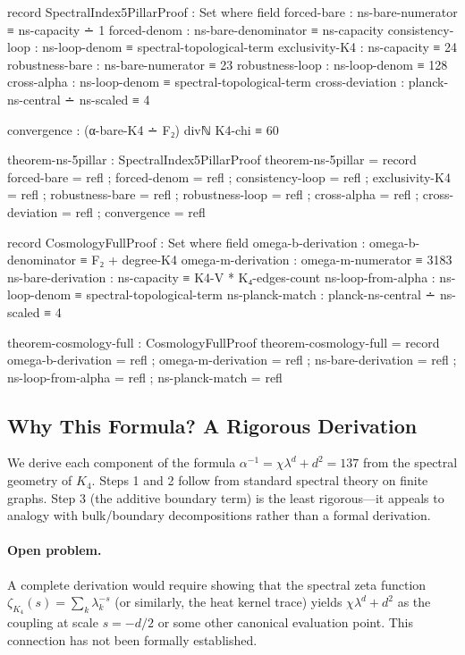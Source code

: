 \documentclass[11pt,a4paper]{book}
\begin{document}
\begin{code}
record SpectralIndex5PillarProof : Set where
  field
    forced-bare : ns-bare-numerator ≡ ns-capacity ∸ 1
    forced-denom : ns-bare-denominator ≡ ns-capacity
    consistency-loop : ns-loop-denom ≡ spectral-topological-term
    exclusivity-K4 : ns-capacity ≡ 24
    robustness-bare : ns-bare-numerator ≡ 23
    robustness-loop : ns-loop-denom ≡ 128
    cross-alpha : ns-loop-denom ≡ spectral-topological-term
    cross-deviation : planck-ns-central ∸ ns-scaled ≡ 4
    
    convergence : (α-bare-K4 ∸ F₂) divℕ K4-chi ≡ 60

theorem-ns-5pillar : SpectralIndex5PillarProof
theorem-ns-5pillar = record
  { forced-bare = refl
  ; forced-denom = refl
  ; consistency-loop = refl
  ; exclusivity-K4 = refl
  ; robustness-bare = refl
  ; robustness-loop = refl
  ; cross-alpha = refl
  ; cross-deviation = refl
  ; convergence = refl
  }

record CosmologyFullProof : Set where
  field
    omega-b-derivation : omega-b-denominator ≡ F₂ + degree-K4
    omega-m-derivation : omega-m-numerator ≡ 3183
    ns-bare-derivation : ns-capacity ≡ K4-V * K₄-edges-count
    ns-loop-from-alpha : ns-loop-denom ≡ spectral-topological-term
    ns-planck-match    : planck-ns-central ∸ ns-scaled ≡ 4

theorem-cosmology-full : CosmologyFullProof
theorem-cosmology-full = record
  { omega-b-derivation = refl
  ; omega-m-derivation = refl
  ; ns-bare-derivation = refl
  ; ns-loop-from-alpha = refl
  ; ns-planck-match    = refl
  }
\end{code}

\subsection{Why This Formula? A Rigorous Derivation}
\label{sec:alpha-formula-why}

We derive each component of the formula $\alpha^{-1} = \chi \lambda^d + d^2 = 137$
from the spectral geometry of $K_4$. Steps 1 and 2 follow from standard spectral
theory on finite graphs. Step 3 (the additive boundary term) is the least rigorous---it
appeals to analogy with bulk/boundary decompositions rather than a formal derivation.

\paragraph{Open problem.} A complete derivation would require showing that the
spectral zeta function $\zeta_{K_4}(s) = \sum_k \lambda_k^{-s}$ (or similarly, the
heat kernel trace) yields $\chi\lambda^d + d^2$ as the coupling at scale $s = -d/2$
or some other canonical evaluation point. This connection has not been formally
established.
\end{document}
